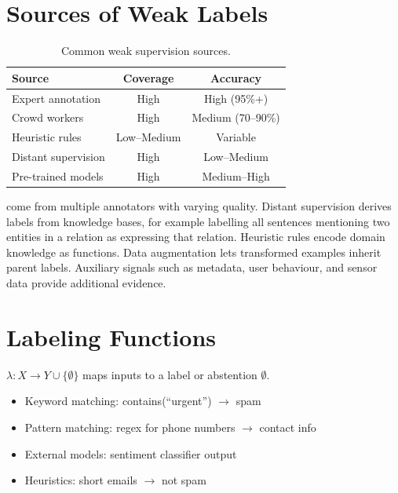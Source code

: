 
\newpage
\section{Sources of Weak Labels}


\begin{table}
\centering
\begin{tabular}{lcc}
\toprule
\textbf{Source} & \textbf{Coverage} & \textbf{Accuracy} \\
\midrule
Expert annotation & High & High (95\%+) \\
Crowd workers & High & Medium (70--90\%) \\
Heuristic rules & Low--Medium & Variable \\
Distant supervision & High & Low--Medium \\
Pre-trained models & High & Medium--High \\
\bottomrule
\end{tabular}
\caption{Common weak supervision sources.}
\label{tab:weak_sources}
\end{table}

 come from multiple annotators with varying quality. Distant supervision derives labels from knowledge bases, for example labelling all sentences mentioning two entities in a relation as expressing that relation. Heuristic rules encode domain knowledge as functions. Data augmentation lets transformed examples inherit parent labels. Auxiliary signals such as metadata, user behaviour, and sensor data provide additional evidence.


\section{Labeling Functions}


 $\lambda: X \to Y \cup \{\emptyset\}$ maps inputs to a label or abstention $\emptyset$.

\begin{itemize}
    \item Keyword matching: contains(``urgent'') $\to$ spam
    \item Pattern matching: regex for phone numbers $\to$ contact info
    \item External models: sentiment classifier output
    \item Heuristics: short emails $\to$ not spam
\end{itemize}

